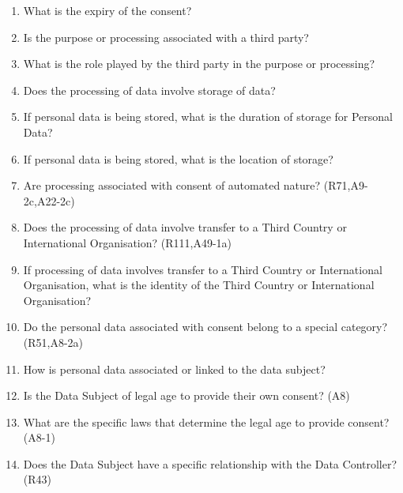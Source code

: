 \begin{enumerate}[label={\textit{CMQ.\theenumi}},resume]
    \item What is the expiry of the consent?
    \item Is the purpose or processing associated with a third party?
    \item What is the role played by the third party in the purpose or processing?
    \item Does the processing of data involve storage of data?
    \item If personal data is being stored, what is the duration of storage for Personal Data?
    \item If personal data is being stored, what is the location of storage?
    \item Are processing associated with consent of automated nature? (R71,A9-2c,A22-2c)
    \item Does the processing of data involve transfer to a Third Country or International Organisation? (R111,A49-1a)
    \item If processing of data involves transfer to a Third Country or International Organisation, what is the identity of the Third Country or International Organisation?
    \item Do the personal data associated with consent belong to a special category? (R51,A8-2a)
    \item How is personal data associated or linked to the data subject?
    \item Is the Data Subject of legal age to provide their own consent? (A8)
    \item What are the specific laws that determine the legal age to provide consent? (A8-1)
    \item Does the Data Subject have a specific relationship with the Data Controller? (R43)
\end{enumerate}

